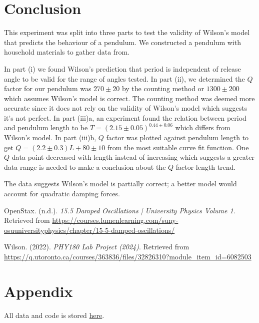 \documentclass[notitlepage, twocolumn, 12pt]{article}
\begin{document}
    \section*{Conclusion}
    \color{WildStrawberry}
    This experiment was split into three parts to test the validity of Wilson's model that predicts the behaviour of a pendulum. We constructed a pendulum with household materials to gather data from.
    
    In part (i) we found Wilson's prediction that period is independent of release angle to be valid for the range of angles tested. 
    In part (ii), we determined the $Q$ factor for our pendulum was $270 \pm 20$ by the counting method or $1300 \pm 200$ which assumes Wilson's model is correct. The counting method was deemed more accurate since it does not rely on the validity of Wilson's model which suggests it's not perfect.
    In part (iii)a, an experiment found the relation between period and pendulum length to be $T = (2.15 \pm 0.05)^{0.44\pm 0.06}$ which differs from Wilson's model.
    In part (iii)b, $Q$ factor was plotted against pendulum length to get $Q = (2.2 \pm 0.3)L + 80 \pm 10$ from the most suitable curve fit function. One $Q$ data point decreased with length instead of increasing which suggests a greater data range is needed to make a conclusion about the $Q$ factor-length trend.
    
    The data suggests Wilson's model is partially correct; a better model would account for quadratic damping forces.
    \color{Black}

    \begin{thebibliography}{}

    OpenStax. (n.d.). \textit{15.5 Damped Oscillations | University Physics Volume 1}. Retrieved from \url{https://courses.lumenlearning.com/suny-osuuniversityphysics/chapter/15-5-damped-oscillations/}

    Wilson. (2022). \textit{PHY180 Lab Project (2024)}. Retrieved from \url{https://q.utoronto.ca/courses/363836/files/32826310?module_item_id=6082503}

    \end{thebibliography}

    \section*{Appendix}
    All data and code is stored \href{https://github.com/PRU1/PHY180-pendulum-project}{here}.
\end{document}
